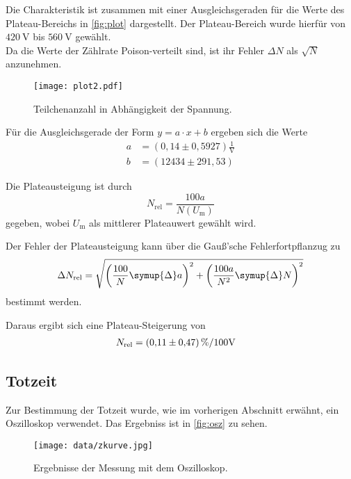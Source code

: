 Die Charakteristik ist zusammen mit einer Ausgleichsgeraden für die Werte des Plateau-Bereichs in \autoref{fig:plot} dargestellt. Der Plateau-Bereich wurde hierfür
von $\SI{420}{\volt}$ bis $\SI{560}{\volt}$ gewählt.\\
Da die Werte der Zählrate Poison-verteilt sind, ist ihr Fehler $\Delta N$ als $\sqrt{N}$ anzunehmen.

\begin{figure}[H]
  \centering
  \texttt{[image: plot2.pdf]}
  \caption{Teilchenanzahl in Abhängigkeit der Spannung.}
  \label{fig:plot}
\end{figure}


Für die Ausgleichsgerade der Form $y = a \cdot x + b$ ergeben sich die Werte
\begin{align*}
  a &= (0,14 \pm 0,5927) \frac{1}{\si{\volt}} \\
  b &= (12434 \pm 291,53)
\end{align*}





Die Plateausteigung ist durch
\begin{equation*}
  N_\text{rel} = \frac{100a}{N(U_\text{m})}
\end{equation*}
gegeben, wobei $U_\text{m}$ als mittlerer Plateauwert gewählt wird.

Der Fehler der Plateausteigung kann über die Gauß'sche Fehlerfortpflanzug zu
\begin{equation*}
  \Delta N_\text{rel} = \sqrt{\left(\frac{100}{N}\symup{\Delta}a\right)^2 + \left(\frac{100a}{N^2} \symup{\Delta}N\right)^2}
\end{equation*}
bestimmt werden.






Daraus ergibt sich eine Plateau-Steigerung von
\begin{align*}
  N_\text{rel} &= \SI{0,11+-0,47}{\percent\per100\volt}
\end{align*}


\subsection{Totzeit}

Zur Bestimmung der Totzeit wurde, wie im vorherigen Abschnitt erwähnt, ein Oszilloskop verwendet. Das Ergebniss ist in \autoref{fig:osz} zu sehen.
\begin{figure}[H]
  \centering
  \texttt{[image: data/zkurve.jpg]}
  \caption{Ergebnisse der Messung mit dem Oszilloskop.}
  \label{fig:osz}
\end{figure}

